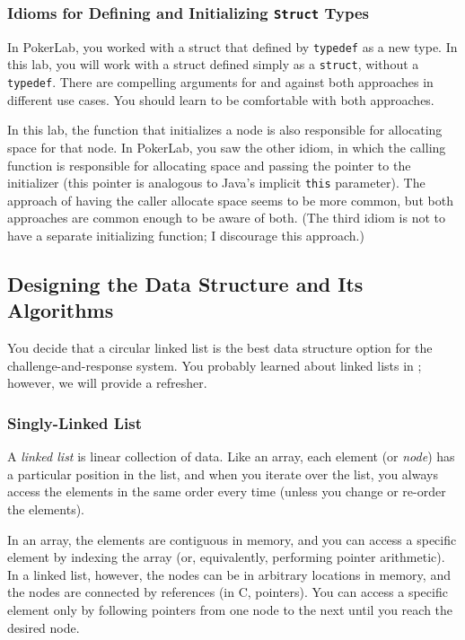 \subsubsection{Idioms for Defining and Initializing \texttt{Struct} Types}

In PokerLab, you worked with a struct that defined by \lstinline{typedef} as a new type.
In this lab, you will work with a struct defined simply as a \lstinline{struct}, without a \lstinline{typedef}.
There are compelling arguments for and against both approaches in different use cases.
You should learn to be comfortable with both approaches.

In this lab, the function that initializes a node is also responsible for allocating space for that node.
In PokerLab, you saw the other idiom, in which the calling function is responsible for allocating space and passing the pointer to the initializer (this pointer is analogous to Java's implicit \lstinline{this} parameter).
The approach of having the caller allocate space seems to be more common, but both approaches are common enough to be aware of both.
(The third idiom is not to have a separate initializing function;
I discourage this approach.)

\subsection{Designing the Data Structure and Its Algorithms}

You decide that a circular linked list is the best data structure option for the challenge-and-response system.
You probably learned about linked lists in \cstwo; however, we will provide a refresher.

\subsubsection{Singly-Linked List} \label{subsubsec:singlylinkedlist}

A \textit{linked list} is linear collection of data.
Like an array, each element (or \textit{node}) has a particular position in the list, and when you iterate over the list, you always access the elements in the same order every time (unless you change or re-order the elements).

In an array, the elements are contiguous in memory, and you can access a specific element by indexing the array (or, equivalently, performing pointer arithmetic).
In a linked list, however, the nodes can be in arbitrary locations in memory, and the nodes are connected by references (in C, pointers).
You can access a specific element only by following pointers from one node to the next until you reach the desired node.

